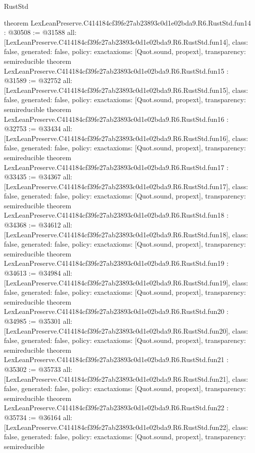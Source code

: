 \begin{lexlean}{RustStd}
\begin{coremodule}
{}
theorem LexLeanPreserve.C414184cf39fe27ab23893c0d1e02bda9.R6.RustStd.fun14 : @30508 := @31588 {
  all: [LexLeanPreserve.C414184cf39fe27ab23893c0d1e02bda9.R6.RustStd.fun14],
  class: false,
  generated: false,
  policy: exact{axioms: [Quot.sound, propext]},
  transparency: semireducible
}
theorem LexLeanPreserve.C414184cf39fe27ab23893c0d1e02bda9.R6.RustStd.fun15 : @31589 := @32752 {
  all: [LexLeanPreserve.C414184cf39fe27ab23893c0d1e02bda9.R6.RustStd.fun15],
  class: false,
  generated: false,
  policy: exact{axioms: [Quot.sound, propext]},
  transparency: semireducible
}
theorem LexLeanPreserve.C414184cf39fe27ab23893c0d1e02bda9.R6.RustStd.fun16 : @32753 := @33434 {
  all: [LexLeanPreserve.C414184cf39fe27ab23893c0d1e02bda9.R6.RustStd.fun16],
  class: false,
  generated: false,
  policy: exact{axioms: [Quot.sound, propext]},
  transparency: semireducible
}
theorem LexLeanPreserve.C414184cf39fe27ab23893c0d1e02bda9.R6.RustStd.fun17 : @33435 := @34367 {
  all: [LexLeanPreserve.C414184cf39fe27ab23893c0d1e02bda9.R6.RustStd.fun17],
  class: false,
  generated: false,
  policy: exact{axioms: [Quot.sound, propext]},
  transparency: semireducible
}
theorem LexLeanPreserve.C414184cf39fe27ab23893c0d1e02bda9.R6.RustStd.fun18 : @34368 := @34612 {
  all: [LexLeanPreserve.C414184cf39fe27ab23893c0d1e02bda9.R6.RustStd.fun18],
  class: false,
  generated: false,
  policy: exact{axioms: [Quot.sound, propext]},
  transparency: semireducible
}
theorem LexLeanPreserve.C414184cf39fe27ab23893c0d1e02bda9.R6.RustStd.fun19 : @34613 := @34984 {
  all: [LexLeanPreserve.C414184cf39fe27ab23893c0d1e02bda9.R6.RustStd.fun19],
  class: false,
  generated: false,
  policy: exact{axioms: [Quot.sound, propext]},
  transparency: semireducible
}
theorem LexLeanPreserve.C414184cf39fe27ab23893c0d1e02bda9.R6.RustStd.fun20 : @34985 := @35301 {
  all: [LexLeanPreserve.C414184cf39fe27ab23893c0d1e02bda9.R6.RustStd.fun20],
  class: false,
  generated: false,
  policy: exact{axioms: [Quot.sound, propext]},
  transparency: semireducible
}
theorem LexLeanPreserve.C414184cf39fe27ab23893c0d1e02bda9.R6.RustStd.fun21 : @35302 := @35733 {
  all: [LexLeanPreserve.C414184cf39fe27ab23893c0d1e02bda9.R6.RustStd.fun21],
  class: false,
  generated: false,
  policy: exact{axioms: [Quot.sound, propext]},
  transparency: semireducible
}
theorem LexLeanPreserve.C414184cf39fe27ab23893c0d1e02bda9.R6.RustStd.fun22 : @35734 := @36164 {
  all: [LexLeanPreserve.C414184cf39fe27ab23893c0d1e02bda9.R6.RustStd.fun22],
  class: false,
  generated: false,
  policy: exact{axioms: [Quot.sound, propext]},
  transparency: semireducible
}
\end{coremodule}
\end{lexlean}
